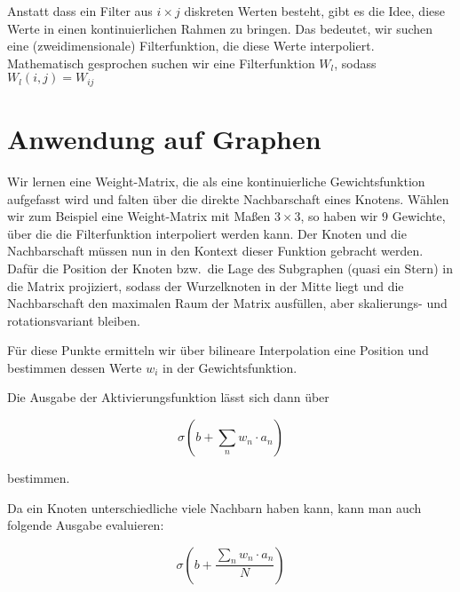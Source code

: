 \documentclass{scrartcl}
\begin{document}
Anstatt dass ein Filter aus $i \times j$ diskreten Werten besteht, gibt es die Idee, diese Werte in einen kontinuierlichen Rahmen zu bringen.
Das bedeutet, wir suchen eine (zweidimensionale) Filterfunktion, die diese Werte interpoliert.
Mathematisch gesprochen suchen wir eine Filterfunktion $W_l$, sodass $W_l(i, j) = W_{ij}$

\section{Anwendung auf Graphen}

Wir lernen eine Weight-Matrix, die als eine kontinuierliche Gewichtsfunktion aufgefasst wird und falten über die direkte Nachbarschaft eines Knotens.
Wählen wir zum Beispiel eine Weight-Matrix mit Maßen $3 \times 3$, so haben wir $9$ Gewichte, über die die Filterfunktion interpoliert werden kann.
Der Knoten und die Nachbarschaft müssen nun in den Kontext dieser Funktion gebracht werden.
Dafür die Position der Knoten bzw.\ die Lage des Subgraphen (quasi ein Stern) in die Matrix projiziert, sodass der Wurzelknoten in der Mitte liegt und die Nachbarschaft den maximalen Raum der Matrix ausfüllen, aber skalierungs- und rotationsvariant bleiben.

Für diese Punkte ermitteln wir über bilineare Interpolation eine Position und bestimmen dessen Werte $w_i$ in der Gewichtsfunktion.

Die Ausgabe der Aktivierungsfunktion lässt sich dann über

\begin{equation}
  \sigma \left( b + \sum_{n} w_n \cdot a_n \right)
\end{equation}

bestimmen.

Da ein Knoten unterschiedliche viele Nachbarn haben kann, kann man auch folgende Ausgabe evaluieren:

\begin{equation}
  \sigma \left( b + \frac{\sum_{n} w_n \cdot a_n}{N} \right)
\end{equation}
\end{document}
